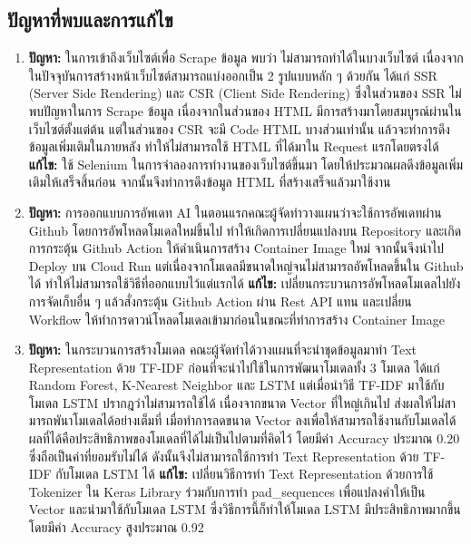 \documentclass[12pt,oneside,openright,a4paper]{cpe-thai-project}
\begin{document}
\begin{itemize}
\begin{enumerate}
\section{ปัญหาที่พบและการแก้ไข}
\begin{enumerate}
  \item  \textbf{ปัญหา: }ในการเข้าถึงเว็บไซต์เพื่อ Scrape ข้อมูล พบว่า ไม่สามารถทำได้ในบางเว็บไซต์ เนื่องจากในปัจจุบันการสร้างหน้าเว็บไซต์สามารถแบ่งออกเป็น 2 รูปแบบหลัก ๆ ด้วยกัน 
  ได้แก่ SSR (Server Side Rendering) และ CSR (Client Side Rendering) ซึ่งในส่วนของ SSR ไม่พบปัญหาในการ Scrape ข้อมูล 
  เนื่องจากในส่วนของ HTML มีการสร้างมาโดยสมบูรณ์ผ่านในเว็บไซต์ตั้งแต่ต้น แต่ในส่วนของ CSR จะมี Code HTML บางส่วนเท่านั้น แล้วจะทำการดึงข้อมูลเพิ่มเติมในภายหลัง 
  ทำให้ไม่สามารถใช้ HTML ที่ได้มาใน Request แรกโดยตรงได้
  \newline\textbf{แก้ไข: }ใช้ Selenium ในการจำลองการทำงานของเว็บไซต์ขึ้นมา โดยให้ประมวณผลดึงข้อมูลเพิ่มเติมให้เสร็จสิ้นก่อน จากนั้นจึงทำการดึงข้อมูล HTML ที่สร้างเสร็จแล้วมาใช้งาน
  \item  \textbf{ปัญหา: }การออกแบบการอัพเดท AI ในตอนแรกคณะผู้จัดทำวางแผนว่าจะใช้การอัพเดทผ่าน Github โดยการอัพโหลดโมเดลใหม่ขึ้นไป ทำให้เกิดการเปลี่ยนแปลงบน Repository 
  และเกิดการกระตุ้น Github Action ให้ดำเนินการสร้าง Container Image ใหม่ จากนั้นจึงนำไป Deploy บน Cloud Run แต่เนื่องจากโมเดลมีขนาดใหญ่จนไม่สามารถอัพโหลดขึ้นใน Github ได้
  ทำให้ไม่สามารถใช้วิธีที่ออกแบบไว้แต่แรกได้ 
  \newline\textbf{แก้ไข: }เปลี่ยนกระบวนการอัพโหลดโมเดลไปยังการจัดเก็บอื่น ๆ แล้วสั่งกระตุ้น Github Action ผ่าน Rest API แทน 
  และเปลี่ยน Workflow ให้ทำการดาวน์โหลดโมเดลเข้ามาก่อนในขณะที่ทำการสร้าง Container Image
  \item  \textbf{ปัญหา: }ในกระบวนการสร้างโมเดล คณะผู้จัดทำได้วางแผนที่จะนำชุดข้อมูลมาทำ Text Representation ด้วย TF-IDF ก่อนที่จะนำไปใช้ในการพัฒนาโมเดลทั้ง 3 โมเดล
  ได้แก่ Random Forest, K-Nearest Neighbor และ LSTM แต่เมื่อนำวิธี TF-IDF มาใช้กับโมเดล LSTM ปรากฎว่าไม่สามารถใช้ได้ เนื่องจากขนาด Vector ที่ใหญ่เกินไป
  ส่งผลให้ไม่สามารถพันาโมเดลได้อย่างเต็มที่ เมื่อทำการลดขนาด Vector ลงเพื่อให้สามารถใช้งานกับโมเดลได้ ผลที่ได้คือประสิทธิภาพของโมเดลที่ได้ไม่เป็นไปตามที่คิดไว้
  โดยมีค่า Accuracy ประมาณ 0.20 ซึ่งถือเป็นค่าที่ยอมรับไม่ได้ ดังนั้นจึงไม่สามารถใช้การทำ Text Representation ด้วย TF-IDF กับโมเดล LSTM ได้
  \newline\textbf{แก้ไข: }เปลี่ยนวิธีการทำ Text Representation ด้วยการใช้ Tokenizer ใน Keras Library ร่วมกับการทำ pad\_sequences 
  เพื่อแปลงคำให้เป็น Vector และนำมาใช้กับโมเดล LSTM ซึ่งวิธีการนี้ก็ทำให้โมเดล LSTM มีประสิทธิภาพมากขึ้น โดยมีค่า Accuracy สูงประมาณ 0.92 
\end{enumerate}


\end{enumerate}
\end{itemize}
\end{document}
